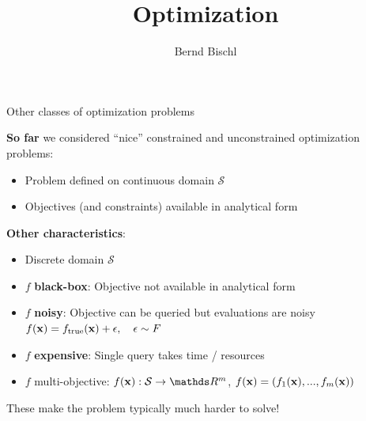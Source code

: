 



\usepackage{wrapfig}

\newcommand{\titlefigure}{figure_man/GE.pdf}
\newcommand{\learninggoals}{
\item Discrete
\item Black-box
\item Noisy
\item Multi-objective
}



\title{Optimization}
\author{Bernd Bischl}
\date{}



\sloppy

\begin{vbframe}{Other classes of optimization problems}

\textbf{So far} we considered \enquote{nice} constrained and unconstrained optimization problems: 

\begin{itemize}
	\item Problem defined on continuous domain $\mathcal{S}$
	\item Objectives (and constraints) available in analytical form
\end{itemize}

\lz 

\textbf{Other characteristics}: 
\begin{itemize}
	\item Discrete domain $\mathcal{S}$
	\item $f$ \textbf{black-box}: Objective not available in analytical form
	\item $f$ \textbf{noisy}: Objective can be queried but evaluations are noisy $f(\mathbf{x}) = f_{\text{true}}(\mathbf{x}) + \epsilon, \quad \epsilon \sim F$
	\item $f$ \textbf{expensive}: Single query takes time / resources
	\item $f$ multi-objective: $\fx: \mathcal{S} \to \R^m$, $f(\mathbf{x}) = \left(f_1(\mathbf{x}), ..., f_m(\mathbf{x})\right)$
\end{itemize}

\lz 

These make the problem typically much harder to solve!

\end{vbframe}


